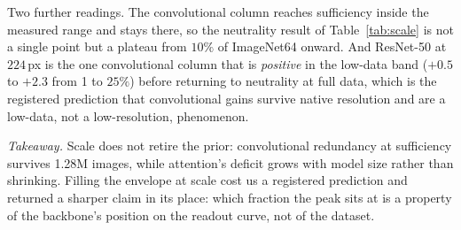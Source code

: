 Two further readings. The convolutional column reaches sufficiency inside
the measured range and stays there, so the neutrality result of
Table~\ref{tab:scale} is not a single point but a plateau from $10\%$ of
ImageNet64 onward. And ResNet-50 at $224$\,px is the one convolutional
column that is \emph{positive} in the low-data band ($+0.5$ to $+2.3$ from
1 to $25\%$) before returning to neutrality at full data, which is the
registered prediction that convolutional gains survive native resolution
and are a low-data, not a low-resolution, phenomenon.

\emph{Takeaway.} Scale does not retire the prior: convolutional
redundancy at sufficiency survives 1.28M images, while attention's
deficit grows with model size rather than shrinking. Filling the envelope
at scale cost us a registered prediction and returned a sharper claim in
its place: which fraction the peak sits at is a property of the backbone's
position on the readout curve, not of the dataset.
